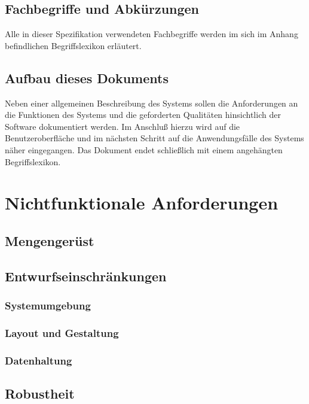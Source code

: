 \documentclass[a4paper,10pt,titlepage]{article}
\begin{document}
\subsection{Fachbegriffe und Abkürzungen}

Alle in dieser Spezifikation verwendeten Fachbegriffe werden im sich im Anhang befindlichen Begriffslexikon erläutert.

\subsection{Aufbau dieses Dokuments}

Neben einer allgemeinen Beschreibung des Systems sollen die Anforderungen an die Funktionen des Systems und die geforderten Qualitäten hinsichtlich der Software dokumentiert werden. 
Im Anschluß hierzu wird auf die Benutzeroberfläche und im nächsten Schritt auf die Anwendungsfälle des Systems näher eingegangen. 
Das Dokument endet schließlich mit einem angehängten Begriffslexikon.

\section{Nichtfunktionale Anforderungen}
\subsection{Mengengerüst}
\label{Mengengeruest}

\subsection{Entwurfseinschränkungen}
\subsubsection{Systemumgebung}

\subsubsection{Layout und Gestaltung}

\subsubsection{Datenhaltung}
\label{datenhaltung}

\subsection{Robustheit}
\end{document}
